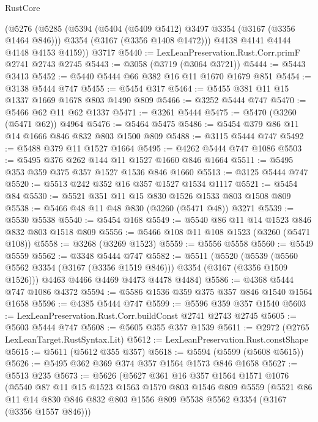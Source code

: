 \begin{lexlean}{RustCore}
\begin{coremodule}
    (@5276
      (@5285
        (@5394
          (@5404 (@5409 @5412) @3497 @3354 (@3167 (@3356 @1464 @846)))
          @3354
          (@3167 (@3356 @1408 @1472)))
        @4138
        @4141
        @4144
        @4148
        @4153
        @4159))
    @3717
@5440 := LexLeanPreservation.Rust.Corr.primF @2741 @2743 @2745
@5443 := @3058 (@3719 (@3064 @3721))
@5444 := @5443 @3413
@5452 := @5440 @5444 @66 @382 @16 @11 @1670 @1679 @851
@5454 := @3138 @5444 @747
@5455 := @5454 @317
@5464 := @5455 @381 @11 @15 @1337 @1669 @1678 @803 @1490 @809
@5466 := @3252 @5444 @747
@5470 := @5466 @62 @11 @62 @1337
@5471 := @3261 @5444
@5475 := @5470 (@3260 (@5471 @62)) @4964
@5476 := @5464 @5475
@5486 := @5454 @379 @86 @11 @14 @1666 @846 @832 @803 @1500 @809
@5488 := @3115 @5444 @747
@5492 := @5488 @379 @11 @1527 @1664
@5495 := @4262 @5444 @747 @1086
@5503 := @5495 @376 @262 @144 @11 @1527 @1660 @846 @1664
@5511 := @5495 @353 @359 @375 @357 @1527 @1536 @846 @1660
@5513 := @3125 @5444 @747
@5520 := @5513 @242 @352 @16 @357 @1527 @1534 @1117
@5521 := @5454 @84
@5530 := @5521 @351 @11 @15 @830 @1526 @1533 @803 @1508 @809
@5538 := @5466 @48 @11 @48 @830 (@3260 (@5471 @48)) @3271
@5539 := @5530 @5538
@5540 := @5454 @168
@5549 := @5540 @86 @11 @14 @1523 @846 @832 @803 @1518 @809
@5556 := @5466 @108 @11 @108 @1523 (@3260 (@5471 @108))
@5558 := @3268 (@3269 @1523)
@5559 := @5556 @5558
@5560 := @5549 @5559
@5562 := @3348 @5444 @747
@5582 := @5511
    (@5520
      (@5539 (@5560 @5562 @3354 (@3167 (@3356 @1519 @846))) @3354 (@3167 (@3356 @1509 @1526)))
      @4463
      @4466
      @4469
      @4473
      @4478
      @4484)
@5586 := @4368 @5444 @747 @1086 @4372
@5594 := @5586 @1536 @359 @375 @357 @846 @1540 @1564 @1658
@5596 := @4385 @5444 @747
@5599 := @5596 @359 @357 @1540
@5603 := LexLeanPreservation.Rust.Corr.buildConst @2741 @2743 @2745
@5605 := @5603 @5444 @747
@5608 := @5605 @355 @357 @1539
@5611 := @2972 (@2765 LexLeanTarget.RustSyntax.Lit)
@5612 := LexLeanPreservation.Rust.constShape
@5615 := @5611 (@5612 @355 @357)
@5618 := @5594 (@5599 (@5608 @5615))
@5626 := @5495 @362 @369 @374 @357 @1564 @1573 @846 @1658
@5627 := @5513 @235
@5673 := @5626
    (@5627
      @361
      @16
      @357
      @1564
      @1571
      @1076
      (@5540
        @87
        @11
        @15
        @1523
        @1563
        @1570
        @803
        @1546
        @809
        @5559
        (@5521
          @86
          @11
          @14
          @830
          @846
          @832
          @803
          @1556
          @809
          @5538
          @5562
          @3354
          (@3167 (@3356 @1557 @846)))

\end{coremodule}
\end{lexlean}
